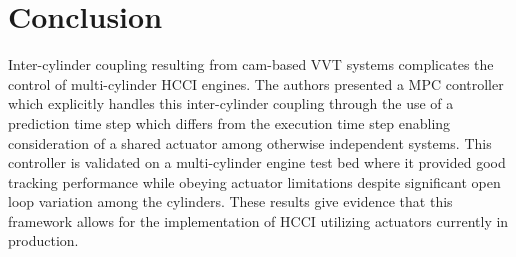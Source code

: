 \section{Conclusion}
Inter-cylinder coupling resulting from cam-based VVT systems complicates the control of multi-cylinder HCCI engines. The authors presented a MPC controller which explicitly handles this inter-cylinder coupling through the use of a prediction time step which differs from the execution time step enabling consideration of a shared actuator among otherwise independent systems. This controller is validated on a multi-cylinder engine test bed where it provided good tracking performance while obeying actuator limitations despite significant open loop variation among the cylinders. These results give evidence that this framework allows for the implementation of HCCI utilizing actuators currently in production.

